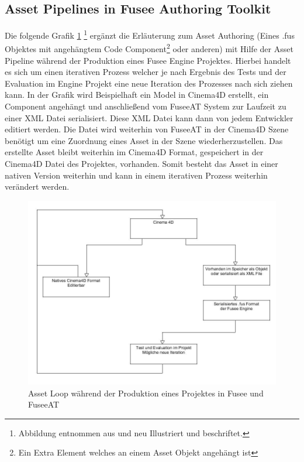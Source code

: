 \documentclass[pagesize, paper=a4, fontsize=12pt, titlepage=true, headings=small, headnosepline, abstractoff, liststotoc, nochapterprefix, plainheadsepline, twoside]{scrreprt}
\begin{document}
\subsection{Asset Pipelines in Fusee Authoring Toolkit}
Die folgende Grafik \ref{FuseeATAssetIteration} \footnote{Abbildung entnommen aus \cite[S. 7]{Carter2004} und neu Illustriert und beschriftet.} ergänzt die Erläuterung zum Asset Authoring (Eines .fus Objektes mit angehängtem Code Component\footnote{Ein Extra Element welches an einem Asset Objekt angehängt ist} oder anderen) mit Hilfe der Asset Pipeline während der Produktion eines Fusee Engine Projektes. Hierbei handelt es sich um einen iterativen Prozess welcher je nach Ergebnis des Tests und der Evaluation im Engine Projekt eine neue Iteration des Prozesses nach sich ziehen kann. In der Grafik wird Beispielhaft ein Model in Cinema4D erstellt, ein Component angehängt und anschließend vom FuseeAT System zur Laufzeit zu einer XML Datei serialisiert. Diese XML Datei kann dann von jedem Entwickler editiert werden. Die Datei wird weiterhin von FuseeAT in der Cinema4D Szene benötigt um eine Zuordnung eines Asset in der Szene wiederherzustellen.
Das erstellte Asset bleibt weiterhin im Cinema4D Format, gespeichert in der Cinema4D Datei des Projektes, vorhanden. Somit besteht das Asset in einer nativen Version weiterhin und kann in einem iterativen Prozess weiterhin verändert werden.

\begin{figure}[ht]
	\centering
  \includegraphics[width=\linewidth]{Bilder/FuseeATAssetPipeline.jpg}
	\caption{Asset Loop während der Produktion eines Projektes in Fusee und FuseeAT}
	\label{FuseeATAssetIteration}
\end{figure}
\end{document}
